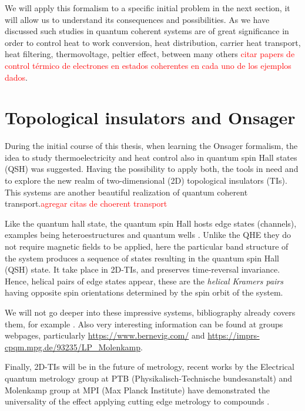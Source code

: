 We will apply this formalism to a specific initial problem in the next section, it will allow us to understand its consequences and possibilities. As we have discussed such studies in quantum coherent systems are of great significance in order to control heat to work conversion, heat distribution, carrier heat transport, heat filtering, thermovoltage, peltier effect, between many others \textcolor{red}{citar papers de control térmico de electrones en estados coherentes en cada uno de los ejemplos dados}.


\section{Topological insulators and Onsager}
\label{sec:teo:onsaTopo}


During the initial course of this thesis, when  learning the Onsager formalism, the idea to study thermoelectricity and heat control also in quantum spin Hall states (QSH) was suggested. Having the possibility to apply both, the tools in need and to explore the new realm of two-dimensional (2D) topological insulators (TIs). This systems are another beautiful realization of quantum coherent transport.\textcolor{red}{agregar citas de choerent transport}

Like the quantum hall state, the quantum spin Hall  hosts edge states (channels)\cite{nowack2013imaging}, 
examples being  heteroestructures and  quantum wells \cite{konig2008quantum, Koenig766,bernevig2006qsh,bernevig2006prl}. 
Unlike the QHE they do not require magnetic fields to be applied, here the particular band structure of the system produces a sequence of states resulting in the quantum spin Hall (QSH) state. It take place in 2D-TIs, and preserves time-reversal invariance. Hence, helical pairs of edge states appear, these are the \textit{helical Kramers pairs} \cite{kanemele2005,bernevig2006quantum,Koenig766, Roth2009} having opposite spin orientations determined by the spin orbit of the system.

We will not go deeper into these impressive systems, bibliography already covers them, for example \cite{maciejko2011quantum, konig2008quantum}. Also very interesting information can be found at groups webpages, particularly \url{https://www.bernevig.com/} and \url{https://imprs-cpqm.mpg.de/93235/LP_Molenkamp}.

Finally, 2D-TIs will be in the future of metrology, recent works by the Electrical quantum metrology group at PTB (Physikalisch-Technische bundesanstalt) and Molenkamp group at MPI (Max Planck Institute) have demonstrated the universality of the effect applying cutting edge metrology to  compounds \cite{gotz2018zero}. 


